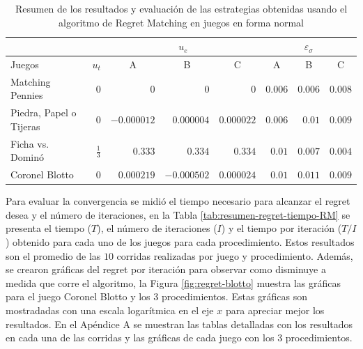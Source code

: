 \begin{table}[htpb]
    \centering
    \begin{tabular}{l|r|r r r|r r r}
        &  & \multicolumn{3}{|c}{$u_e$} & \multicolumn{3}{|c}{$\varepsilon_{\sigma}$}  \\ \hline
        Juegos & $u_t$ & \multicolumn{1}{|c}{A} & \multicolumn{1}{c}{B} & \multicolumn{1}{c|}{C}
          & \multicolumn{1}{|c}{A} & \multicolumn{1}{c}{B} & \multicolumn{1}{c}{C} \\ \hline
        Matching Pennies
            & $0$ & $0$ & $0$ & $0$ & $0.006$ & $0.006$ & $0.008$ \\
        Piedra, Papel o Tijeras
            & $0$ & $-0.000012$ & $0.000004$ & $0.000022$ & $0.006$ & $0.01$ & $0.009$ \\
        Ficha vs. Dominó
            & $\frac{1}{3}$ & $0.333$ & $0.334$ & $0.334$ & $0.01$ & $0.007$ & $0.004$ \\
        Coronel Blotto
            & $0$ & $0.000219$ & $-0.000502$ & $0.000024$ & $0.01$ & $0.011$ & $0.009$ \\
        \hline
    \end{tabular}
    \caption{Resumen de los resultados y evaluación de las estrategias obtenidas usando el algoritmo de Regret Matching en juegos en forma normal}
    \label{tab:resumen-resultados-RM}
\end{table}

Para evaluar la convergencia se midió el tiempo necesario para alcanzar el regret desea y el número de iteraciones, en la Tabla \ref{tab:resumen-regret-tiempo-RM} se presenta el tiempo ($T$), el número de iteraciones ($I$) y el tiempo por iteración ($T/I$) obtenido para cada uno de los juegos para cada procedimiento. Estos resultados son el promedio de las $10$ corridas realizadas por juego y procedimiento. Además, se crearon gráficas del regret por iteración para observar como disminuye a medida que corre el algoritmo, la  Figura  \ref{fig:regret-blotto} muestra las gráficas para el juego Coronel Blotto y los $3$ procedimientos. Estas gráficas son mostradadas con una escala logarítmica en el eje $x$ para apreciar mejor los resultados. En el Apéndice A se muestran las tablas detalladas con los resultados en cada una de las corridas y las gráficas de cada juego con los $3$ procedimientos.

